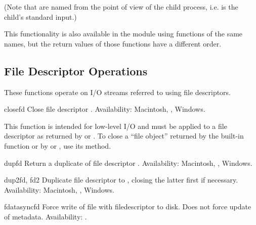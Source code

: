 (Note that  are named from the point of view of the child
process, i.e.  is the child's standard input.)

This functionality is also available in the  module
using functions of the same names, but the return values of those
functions have a different order.


\subsection{File Descriptor Operations \label{os-fd-ops}}

These functions operate on I/O streams referred to
using file descriptors.


\begin{funcdesc}{close}{fd}
Close file descriptor .
Availability: Macintosh, \UNIX, Windows.

\begin{notice}
This function is intended for low-level I/O and must be applied
to a file descriptor as returned by  or
.  To close a ``file object'' returned by the
built-in function  or by  or
, use its  method.
\end{notice}
\end{funcdesc}

\begin{funcdesc}{dup}{fd}
Return a duplicate of file descriptor .
Availability: Macintosh, \UNIX, Windows.
\end{funcdesc}

\begin{funcdesc}{dup2}{fd, fd2}
Duplicate file descriptor  to , closing the latter
first if necessary.
Availability: Macintosh, \UNIX, Windows.
\end{funcdesc}

\begin{funcdesc}{fdatasync}{fd}
Force write of file with filedescriptor  to disk.
Does not force update of metadata.
Availability: \UNIX.
\end{funcdesc}

